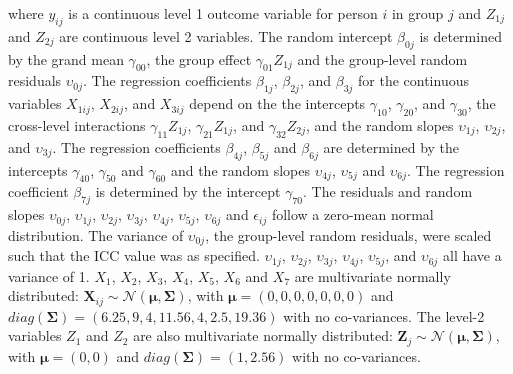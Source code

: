 \documentclass[10pt, a4paper, titlepage]{article}
\begin{document}
where $y_{ij}$ is a continuous level 1 outcome variable for person $i$ in group $j$ and $Z_{1j}$ and $Z_{2j}$ are continuous level 2 variables. The random intercept $\beta_{0j}$ is determined by the grand mean $\gamma_{00}$, the group effect $\gamma_{01}Z_{1j}$ and the group-level random residuals $\upsilon_{0j}$. The regression coefficients $\beta_{1j}$, $\beta_{2j}$, and $\beta_{3j}$ for the continuous variables $X_{1ij}$, $X_{2ij}$, and $X_{3ij}$ depend on the the intercepts $\gamma_{10}$, $\gamma_{20}$, and $\gamma_{30}$, the cross-level interactions $\gamma_{11}Z_{1j}$, $\gamma_{21}Z_{1j}$, and $\gamma_{32}Z_{2j}$, and the random slopes $\upsilon_{1j}$, $\upsilon_{2j}$, and $\upsilon_{3j}$. The regression coefficients $\beta_{4j}$, $\beta_{5j}$ and $\beta_{6j}$ are determined by the intercepts $\gamma_{40}$, $\gamma_{50}$ and $\gamma_{60}$ and the random slopes $\upsilon_{4j}$, $\upsilon_{5j}$ and $\upsilon_{6j}$. The regression coefficient $\beta_{7j}$ is determined by the intercept $\gamma_{70}$. The residuals and random slopes $\upsilon_{0j}$, $\upsilon_{1j}$, $\upsilon_{2j}$, $\upsilon_{3j}$, $\upsilon_{4j}$, $\upsilon_{5j}$, $\upsilon_{6j}$ and $\epsilon_{ij}$ follow a zero-mean normal distribution. The variance of $\upsilon_{0j}$, the group-level random residuals, were scaled such that the ICC value was as specified. $\upsilon_{1j}$, $\upsilon_{2j}$, $\upsilon_{3j}$, $\upsilon_{4j}$, $\upsilon_{5j}$, and $\upsilon_{6j}$ all have a variance of 1. $X_1$, $X_2$, $X_3$, $X_4$, $X_5$, $X_6$ and $X_7$ are multivariate normally distributed: $\mathbf{X}_{ij} \sim \mathcal{N}(\boldsymbol{\mu}, \boldsymbol{\Sigma})$, with $\boldsymbol{\mu} = (0, 0, 0, 0, 0, 0, 0)$ and $diag(\boldsymbol{\Sigma}) = (6.25, 9, 4, 11.56, 4, 2.5, 19.36)$ with no co-variances. The level-2 variables $Z_1$ and $Z_2$ are also multivariate normally distributed:  $\mathbf{Z}_{j} \sim \mathcal{N}(\boldsymbol{\mu}, \boldsymbol{\Sigma})$, with $\boldsymbol{\mu} = (0, 0)$ and $diag(\boldsymbol{\Sigma}) = (1, 2.56)$ with no co-variances.
\end{document}
